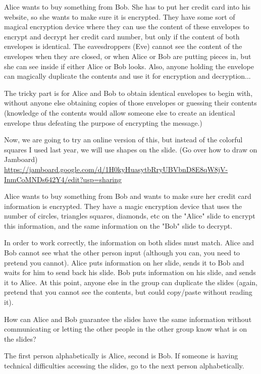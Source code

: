 \documentclass[letterpaper, 11 pt]{article}
\begin{document}
\begin{br}[15 minutes]
 Alice wants to buy something from Bob. She has to put her credit card into his website, so she wants to make sure it is encrypted. They have some sort of magical encryption device where they can use the content of these envelopes to encrypt and decrypt her credit card number, but only if the content of both envelopes is identical. The eavesdroppers (Eve) cannot see the content of the envelopes when they are closed, or when Alice or Bob are putting pieces in, but she can see inside if either Alice or Bob looks. Also, anyone holding the envelope can magically duplicate the contents and use it for encryption and decryption...
 
 The tricky part is for Alice and Bob to obtain identical envelopes to begin with, without anyone else obtaining copies of those envelopes or guessing their contents (knowledge of the contents would allow someone else to create an identical envelope thus defeating the purpose of encrypting the message.) 
 
 Now, we are going to try an online version of this, but instead of the colorful squares I used last year, we will use shapes on the slide. (Go over how to draw on Jamboard) \url{https://jamboard.google.com/d/1H0kyHuasytbRryUBVbnD8E8qW8jV-InmCoMNDs642Y4/edit?usp=sharing}

 
Alice wants to buy something from Bob and wants to make sure her credit card information is encrypted. They have a magic encryption device that uses the number of circles, triangles squares, diamonds, etc on the "Alice" slide to encrypt this information, and the same information on the "Bob" slide to decrypt. 

In order to work correctly, the information on both slides must match. Alice and Bob cannot see what the other person input (although you can, you need to pretend you cannot). Alice puts information on her slide, sends it to Bob and waits for him to send back his slide. Bob puts information on his slide, and sends it to Alice. At this point, anyone else in the group can duplicate the slides (again, pretend that you cannot see the contents, but could copy/paste without reading it).

How can Alice and Bob guarantee the slides have the same information without communicating or letting the other people in the other group know what is on the slides?


The first person alphabetically is Alice, second is Bob. If someone is having technical difficulties accessing the slides, go to the next person alphabetically.


\end{br}
\end{document}
